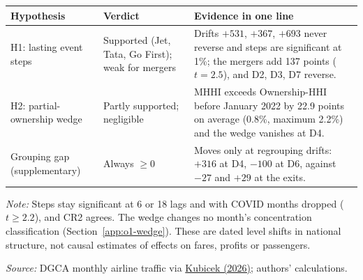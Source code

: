\documentclass[12pt,a4paper]{article}
\begin{document}
{\begin{minipage}{\linewidth}
\label{tab:o1-hypotheses}
\centering
{\footnotesize{}\setlength{\tabcolsep}{4pt}
\begin{tabular}{@{}p{3.0cm}p{2.6cm}p{8.4cm}@{}}
\toprule
Hypothesis & Verdict & Evidence in one line \\
\midrule
H1: lasting event steps & Supported (Jet, Tata, Go First); weak for mergers & Drifts $+531$, $+367$, $+693$ never reverse and steps are significant at 1\%; the mergers add 137 points ($t=2.5$), and D2, D3, D7 reverse. \\
H2: partial-ownership wedge & Partly supported; negligible & MHHI exceeds Ownership-HHI before January 2022 by 22.9 points on average (0.8\%, maximum 2.2\%) and the wedge vanishes at D4. \\
Grouping gap (supplementary) & Always $\geq0$ & Moves only at regrouping drifts: $+316$ at D4, $-100$ at D6, against $-27$ and $+29$ at the exits. \\
\bottomrule
\end{tabular}\par}
\vspace{4pt}
{\footnotesize{}\raggedright\textit{Note:} Steps stay significant at 6 or 18 lags and with COVID months dropped ($t\geq2.2$), and CR2 agrees. The wedge changes no month's concentration classification (Section~\ref{app:o1-wedge}). These are dated level shifts in national structure, not causal estimates of effects on fares, profits or passengers.\par
\textit{Source:} DGCA monthly airline traffic via \href{https://github.com/mkubicek/india-aviation-stats/tree/16770ac59dae61ce7b80fd8bd67dd7f4cef280a6}{Kubicek (2026)}; authors' calculations.\par}
\end{minipage}
\par}
\end{document}

